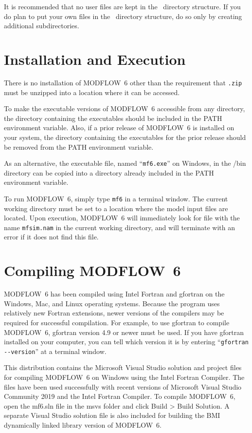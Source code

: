 \documentclass[11pt,twoside,twocolumn]{usgsreport}
\begin{document}
It is recommended that no user files are kept in the \modflowversion~directory structure.  If you do plan to put your own files in the \modflowversion~directory structure, do so only by creating additional subdirectories.

\section{Installation and Execution}
There is no installation of MODFLOW~6 other than the requirement that \texttt{\modflowversion.zip} must be unzipped into a location where it can be accessed.  

To make the executable versions of MODFLOW~6 accessible from any directory, the directory containing the executables should be included in the PATH environment variable.  Also, if a prior release of MODFLOW~6 is installed on your system, the directory containing the executables for the prior release should be removed from the PATH environment variable.

As an alternative, the executable file, named ``\texttt{mf6.exe}'' on Windows, in the \modflowversion{}/bin directory can be copied into a directory already included in the PATH environment variable.

To run MODFLOW~6, simply type \texttt{mf6} in a terminal window.  The current working directory must be set to a location where the model input files are located.  Upon execution, MODFLOW~6 will immediately look for file with the name \texttt{mfsim.nam} in the current working directory, and will terminate with an error if it does not find this file.

\section{Compiling MODFLOW~6}
MODFLOW~6 has been compiled using Intel Fortran and gfortran on the Windows, Mac, and Linux operating systems.  Because the program uses relatively new Fortran extensions, newer versions of the compilers may be required for successful compilation.  For example, to use gfortran to compile MODFLOW~6, gfortran version 4.9 or newer must be used.  If you have gfortran installed on your computer, you can tell which version it is by entering ``\verb|gfortran --version|'' at a terminal window.

This distribution contains the Microsoft Visual Studio solution and project files for compiling MODFLOW~6 on Windows using the Intel Fortran Compiler.  The files have been used successfully with recent versions of Microsoft Visual Studio Community 2019 and the Intel Fortran Compiler.  To compile MODFLOW~6, open the mf6.sln file in the msvs folder and click Build >  Build Solution.  A separate Visual Studio solution file is also included for building the BMI dynamically linked library version of MODFLOW~6.
\end{document}
